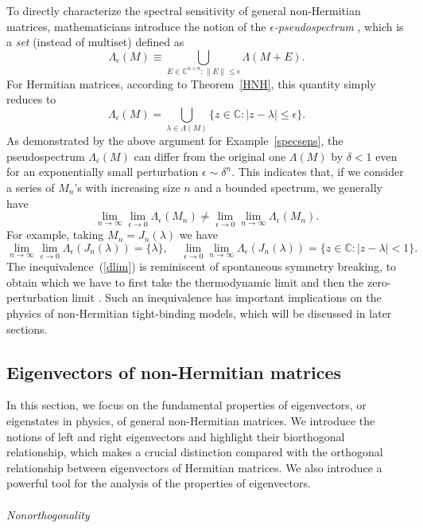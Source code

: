 \documentclass{tADP2e}
\theoremstyle{plain}
\theoremstyle{plain}
\theoremstyle{definition}
\begin{document}
To directly characterize the spectral sensitivity of general non-Hermitian matrices, mathematicians introduce the notion of the \emph{$\epsilon$-pseudospectrum} \cite{VJM79,Reichel1992}, which is a \emph{set} (instead of multiset) defined as
\begin{equation}
\Lambda_\epsilon(M)\equiv\bigcup_{E\in \mathbb{C}^{n\times n}: \|E\|\le\epsilon}\Lambda(M+E).\label{Lamep}
\end{equation}
For Hermitian matrices, according to Theorem~\ref{HNH}, this quantity simply reduces to
\begin{equation}
\Lambda_\epsilon(M)=\bigcup_{\lambda\in\Lambda(M)}\{z\in\mathbb{C}:|z-\lambda|\le\epsilon\}.
\end{equation}
As demonstrated by the above argument for Example~\ref{specsens}, the pseudospectrum $\Lambda_\epsilon(M)$ can differ from the original one $\Lambda(M)$ by $\delta<1$ even for an exponentially small perturbation $\epsilon\sim\delta^n$.  
This indicates that, if we consider a series of $M_n$'s with increasing size $n$ and a bounded spectrum, we generally have 
\begin{equation}
\lim_{n\to\infty}\lim_{\epsilon\to0}\Lambda_\epsilon(M_n)\neq\lim_{\epsilon\to0}\lim_{n\to\infty}\Lambda_\epsilon(M_n).
\label{dlim}
\end{equation}
For example, taking $M_n=J_n(\lambda)$ we have
\begin{equation} 
\lim_{n\to\infty}\lim_{\epsilon\to0}\Lambda_\epsilon(J_n(\lambda))=\{\lambda\},\;\;\;\;
\lim_{\epsilon\to0}\lim_{n\to\infty}\Lambda_\epsilon(J_n(\lambda))=\{z\in\mathbb{C}:|z-\lambda|<1\}.
\end{equation}
The inequivalence~(\ref{dlim}) is reminiscent of spontaneous symmetry breaking, to obtain which we have to first take the thermodynamic limit and then the zero-perturbation limit \cite{HW15}. Such an inequivalence has important implications on the physics of non-Hermitian tight-binding models, which will be discussed in later sections.





\subsection{Eigenvectors of non-Hermitian matrices\label{seceigv}}
In this section, we focus on the fundamental properties of eigenvectors, or eigenstates in physics, of general non-Hermitian matrices. We introduce the notions of left and right eigenvectors and highlight their biorthogonal relationship, which makes a crucial distinction compared with the orthogonal relationship between eigenvectors of Hermitian matrices. We also introduce a powerful tool for the analysis of the properties of eigenvectors.
\\ \\ {\it Nonorthogonality}
\end{document}
